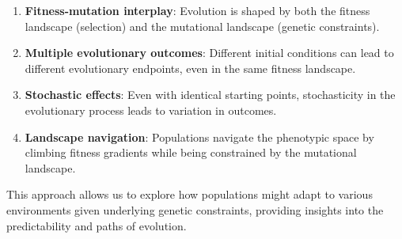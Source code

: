 \documentclass[
]{scrartcl}
\providecommand{\tightlist}{%
  \setlength{\itemsep}{0pt}\setlength{\parskip}{0pt}}\usepackage{longtable,booktabs,array}
\begin{document}
\begin{enumerate}
\def\labelenumi{\arabic{enumi}.}
\tightlist
\item
  \textbf{Fitness-mutation interplay}: Evolution is shaped by both the
  fitness landscape (selection) and the mutational landscape (genetic
  constraints).
\item
  \textbf{Multiple evolutionary outcomes}: Different initial conditions
  can lead to different evolutionary endpoints, even in the same fitness
  landscape.
\item
  \textbf{Stochastic effects}: Even with identical starting points,
  stochasticity in the evolutionary process leads to variation in
  outcomes.
\item
  \textbf{Landscape navigation}: Populations navigate the phenotypic
  space by climbing fitness gradients while being constrained by the
  mutational landscape.
\end{enumerate}

This approach allows us to explore how populations might adapt to
various environments given underlying genetic constraints, providing
insights into the predictability and paths of evolution.
\end{document}
